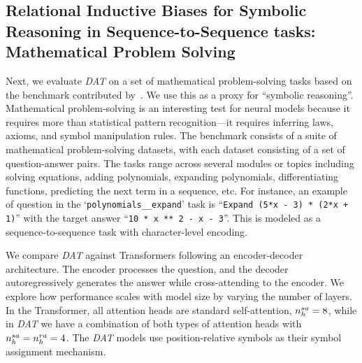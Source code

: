 
\subsection{Relational Inductive Biases for Symbolic Reasoning in Sequence-to-Sequence tasks: Mathematical Problem Solving}\label{ssec:math}

Next, we evaluate \textit{DAT} on a set of mathematical problem-solving tasks based on the benchmark contributed by~\citet{saxtonAnalyzingMathematicalReasoning2019}. We use this as a proxy for ``symbolic reasoning''. Mathematical problem-solving is an interesting test for neural models because it requires more than statistical pattern recognition---it requires inferring laws, axioms, and symbol manipulation rules. The benchmark consists of a suite of mathematical problem-solving datasets, with each dataset consisting of a set of question-answer pairs. The tasks range across several modules or topics including solving equations, adding polynomials, expanding polynomials, differentiating functions, predicting the next term in a sequence, etc. For instance, an example of question in the `\texttt{polynomials\_\_expand}' task is ``\texttt{Expand (5*x - 3) * (2*x + 1)}'' with the target answer ``\texttt{10 * x ** 2 - x - 3}''. This is modeled as a sequence-to-sequence task with character-level encoding.


We compare \textit{DAT} against Transformers following an encoder-decoder architecture. The encoder processes the question, and the decoder autoregressively generates the answer while cross-attending to the encoder. We explore how performance scales with model size by varying the number of layers. In the Transformer, all attention heads are standard self-attention, $n_h^{sa} = 8$, while in \textit{DAT} we have a combination of both types of attention heads with $n_h^{sa} = n_h^{ra} = 4$. The \textit{DAT} models use position-relative symbols as their symbol assignment mechanism.

